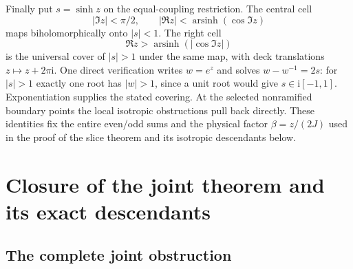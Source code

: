 \documentclass[11pt]{article}
\numberwithin{equation}{section}
\theoremstyle{definition}
\newcommand{\ii}{\mathrm i}
\begin{document}
Finally put $s=\sinh z$ on the equal-coupling restriction.
The central cell
\[
 |\Im z|<\pi/2,\qquad
 |\Re z|<\operatorname{arsinh}(\cos\Im z)
\]
maps biholomorphically onto $|s|<1$. The right cell
\[
 \Re z>\operatorname{arsinh}(|\cos\Im z|)
\]
is the universal cover of $|s|>1$ under the same map, with deck
translations $z\mapsto z+2\pi\ii$.
One direct verification writes $w=e^z$ and solves $w-w^{-1}=2s$:
for $|s|>1$ exactly one root has $|w|>1$, since a unit root would give
$s\in\ii[-1,1]$. Exponentiation supplies the stated covering.
At the selected nonramified boundary points the local isotropic
obstructions pull back directly. These identities fix the entire
even/odd sums and the physical factor $\beta=z/(2J)$ used in the
proof of the slice theorem and its isotropic descendants below.

\section{Closure of the joint theorem and its exact descendants}
\label{main:closure}

\subsection{The complete joint obstruction}
\end{document}
